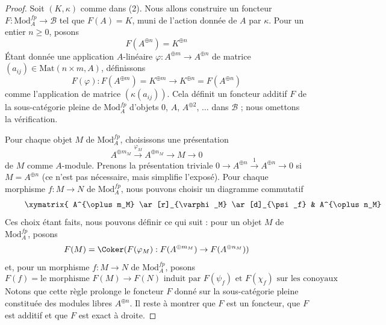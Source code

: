 \begin{proof}
Soit $(K, \kappa)$ comme dans (2). Nous allons construire un foncteur
$F : \text{Mod}^{fp}_A \to \mathcal{B}$ tel que $F(A) = K$,
muni de l'action donnée de $A$ par $\kappa$. Pour un
entier $n \geq 0$, posons
$$
F(A^{\oplus n}) = K^{\oplus n}
$$
Étant donnée une application $A$-linéaire $\varphi : A^{\oplus m} \to A^{\oplus n}$
de matrice $(a_{ij}) \in \text{Mat}(n \times m, A)$, définissons
$$
F(\varphi) :
F(A^{\oplus m}) = K^{\oplus m}
\longrightarrow
K^{\oplus n} = F(A^{\oplus n})
$$
comme l'application de matrice $(\kappa(a_{ij}))$. Cela définit un foncteur
additif $F$ de la sous-catégorie pleine de
$\text{Mod}^{fp}_A$ d'objets $0$, $A$, $A^{\oplus 2}$, $\ldots$
dans $\mathcal{B}$ ; nous omettons la vérification.

\medskip\noindent
Pour chaque objet $M$ de $\text{Mod}^{fp}_A$, choisissons une présentation
$$
A^{\oplus m_M} \xrightarrow{\varphi_M} A^{\oplus n_M} \to M \to 0
$$
de $M$ comme $A$-module. Prenons la présentation triviale
$0 \to A^{\oplus n} \xrightarrow{1} A^{\oplus n} \to 0$ si $M = A^{\oplus n}$
(ce n'est pas nécessaire, mais simplifie l'exposé).
Pour chaque morphisme $f : M \to N$ de
$\text{Mod}^{fp}_A$, nous pouvons choisir un diagramme commutatif
\begin{equation}
\label{equation-map}
\vcenter{
\xymatrix{
A^{\oplus m_M} \ar[r]_{\varphi_M} \ar[d]_{\psi_f} &
A^{\oplus n_M} \ar[r] \ar[d]_{\chi_f} &
M \ar[r] \ar[d]_f & 0 \\
A^{\oplus m_N} \ar[r]^{\varphi_N} &
A^{\oplus n_N} \ar[r] &
N \ar[r] & 0
}
}
\end{equation}
Ces choix étant faits, nous pouvons définir ce qui suit : pour un objet
$M$ de $\text{Mod}^{fp}_A$, posons
$$
F(M) = \Coker(F(\varphi_M) : F(A^{\oplus m_M}) \to F(A^{\oplus n_M}))
$$
et, pour un morphisme $f : M \to N$ de $\text{Mod}^{fp}_A$, posons
$$
F(f) = \text{le morphisme }F(M) \to F(N)\text{ induit par }
F(\psi_f)\text{ et }F(\chi_f)\text{ sur les conoyaux}
$$
Notons que cette règle prolonge le foncteur $F$ donné sur
la sous-catégorie pleine constituée des modules libres $A^{\oplus n}$.
Il reste à montrer que $F$ est un foncteur, que $F$ est additif
et que $F$ est exact à droite.


\end{proof}
